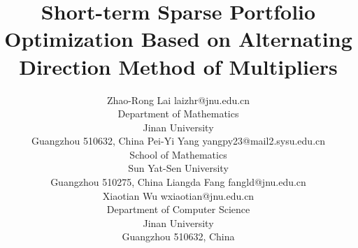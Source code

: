 \documentclass[twoside,11pt]{article}
\DeclareMathOperator*{\argmax}{argmax}
\begin{document}
\title{Short-term Sparse Portfolio Optimization Based on Alternating Direction Method of Multipliers}

\author{\name Zhao-Rong Lai \email laizhr@jnu.edu.cn \\
       \addr Department of Mathematics\\
       Jinan University\\
       Guangzhou 510632, China
       \AND
       \name Pei-Yi Yang \email yangpy23@mail2.sysu.edu.cn \\
       \addr School of Mathematics\\
       Sun Yat-Sen University\\
       Guangzhou 510275, China
       \AND
       \name Liangda Fang \email fangld@jnu.edu.cn \\
       \name Xiaotian Wu \email wxiaotian@jnu.edu.cn \\
       \addr Department of Computer Science\\
       Jinan University\\
       Guangzhou 510632, China}


\maketitle

\newcommand\leqs{\leqslant}

\newcommand\geqs{\geqslant}
\newcommand\mb{\mathbf}
\newcommand{\ud}{\,\mathrm{d}}
\newcommand{\minitab}[2][c]{\begin{tabular}{#1}#2\end{tabular}}
\renewcommand{\algorithmicrequire}{\textbf{Input:}}
\renewcommand{\algorithmicensure}{\textbf{Output:}}

\end{document}
